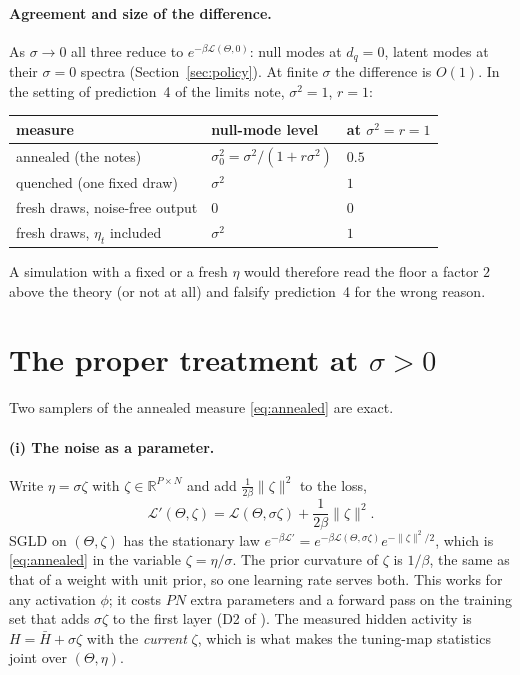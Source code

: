 \documentclass[11pt,a4paper]{article}
\newcommand{\R}{\mathbb R}
\newcommand{\Lc}{\mathcal L}
\theoremstyle{remark}
\begin{document}
\paragraph{Agreement and size of the difference.}
As $\sigma\to0$ all three reduce to $e^{-\beta\Lc(\Theta,0)}$: null modes at
$d_q = 0$, latent modes at their $\sigma = 0$ spectra
(Section~\ref{sec:policy}). At finite $\sigma$ the difference is $O(1)$. In the
setting of prediction~4 of the limits note, $\sigma^2 = 1$, $r = 1$:
\begin{center}
  \begin{tabular}{@{}lll@{}}
    \toprule
    measure & null-mode level & at $\sigma^2 = r = 1$\\
    \midrule
    annealed (the notes) & $\sigma_0^2 = \sigma^2/(1 + r\sigma^2)$ & $0.5$\\
    quenched (one fixed draw) & $\sigma^2$ & $1$\\
    fresh draws, noise-free output & $0$ & $0$\\
    fresh draws, $\eta_t$ included & $\sigma^2$ & $1$\\
    \bottomrule
  \end{tabular}
\end{center}
A simulation with a fixed or a fresh $\eta$ would therefore read the floor a
factor $2$ above the theory (or not at all) and falsify prediction~4 for the
wrong reason.

\section{The proper treatment at \texorpdfstring{$\sigma > 0$}{sigma > 0}}
\label{sec:samplers}

Two samplers of the annealed measure \eqref{eq:annealed} are exact.

\paragraph{(i) The noise as a parameter.}
Write $\eta = \sigma\zeta$ with $\zeta\in\R^{P\times N}$ and add
$\frac{1}{2\beta}\|\zeta\|^2$ to the loss,
\begin{equation}
  \Lc'(\Theta,\zeta) = \Lc(\Theta,\sigma\zeta) + \frac{1}{2\beta}\|\zeta\|^2 .
\end{equation}
SGLD on $(\Theta,\zeta)$ has the stationary law
$e^{-\beta\Lc'} = e^{-\beta\Lc(\Theta,\sigma\zeta)}e^{-\|\zeta\|^2/2}$, which is
\eqref{eq:annealed} in the variable $\zeta = \eta/\sigma$. The prior
curvature of $\zeta$ is $1/\beta$, the same as that of a weight with unit
prior, so one learning rate serves both. This works for any activation
$\phi$; it costs $PN$ extra parameters and a forward pass on the training set
that adds $\sigma\zeta$ to the first layer (D2 of
). The measured hidden activity is
$H = \bar H + \sigma\zeta$ with the \emph{current} $\zeta$, which is what
makes the tuning-map statistics joint over $(\Theta,\eta)$.
\end{document}
